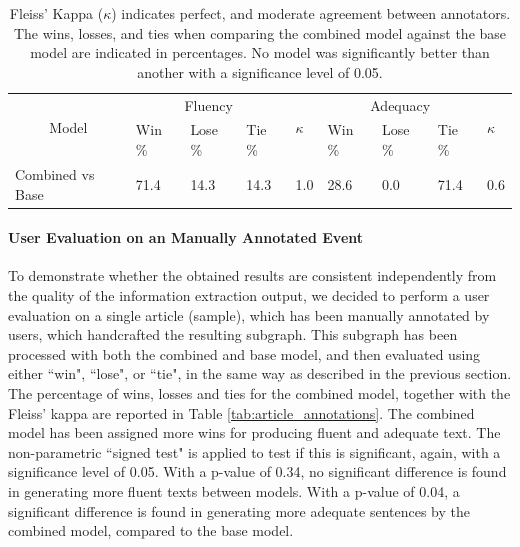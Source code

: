 \documentclass[
hf, %
]{ceurart}
\begin{document}
\begin{table}[ht]
\caption{Fleiss' Kappa ($\kappa$) indicates perfect, and moderate agreement between annotators. The wins, losses, and ties when comparing the combined model against the base model are indicated in percentages. No model was significantly better than another with a significance level of 0.05.}

\centering
\begin{tabular}{|c|lll|l|lll|l|}
\hline
\multirow{2}{*}{Model}                 & \multicolumn{3}{c|}{Fluency}                                     & \multirow{2}{*}{$\kappa$} & \multicolumn{3}{c|}{Adequacy}                                    & \multirow{2}{*}{$\kappa$} \\ \cline{2-4} \cline{6-8}
                                       & \multicolumn{1}{l|}{Win \%} & \multicolumn{1}{l|}{Lose \%} & Tie \% &                    & \multicolumn{1}{l|}{Win \%} & \multicolumn{1}{l|}{Lose \%} & Tie \% &                    \\ \hline
\multicolumn{1}{|l|}{Combined vs Base} & \multicolumn{1}{l|}{71.4}  & \multicolumn{1}{l|}{14.3}   & 14.3  & 1.0                & \multicolumn{1}{l|}{28.6}  & \multicolumn{1}{l|}{0.0}    & 71.4  & 0.6                \\ \hline
\end{tabular}
\label{tab:event_annotations}
\end{table}

\paragraph*{User Evaluation on an Manually Annotated Event} 
\label{sec:result_gen_event}

To demonstrate whether the obtained results are consistent independently from the quality of the information extraction output, we decided to perform a user evaluation on a single article (sample), which has been manually annotated by users, which handcrafted the resulting subgraph. This subgraph has been processed with both the combined and base model, and then evaluated using either ``win", ``lose", or ``tie", in the same way as described in the previous section. The percentage of wins, losses and ties for the combined model, together with the Fleiss' kappa are reported in Table \ref{tab:article_annotations}. The combined model has been assigned more wins for producing fluent and adequate text. The non-parametric ``signed test" is applied to test if this is significant, again, with a significance level of 0.05. With a p-value of 0.34, no significant difference is found in generating more fluent texts between models. With a p-value of 0.04, a significant difference is found in generating more adequate sentences by the combined model, compared to the base model.
\end{document}

